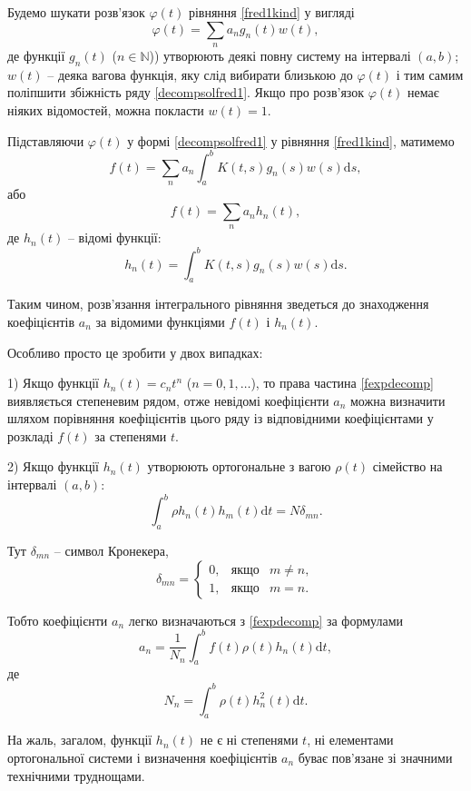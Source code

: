 \documentclass[14pt,twoside]{extreport}
\theoremstyle{mystyle}
\numberwithin{equation}{chapter}
\begin{document}
Будемо шукати розв'язок $\varphi(t)$ рівняння \eqref{fred1kind} у вигляді
\begin{equation}\label{decompsolfred1}
 \varphi(t) = \sum_{n} a_n g_n(t) w(t),
\end{equation}
де функції $g_n(t)$ ($n \in \mathbb{N}$)) утворюють деякі повну систему на інтервалі $(a, b)$; $w(t)$ -- деяка вагова функція, яку слід вибирати близькою до $\varphi(t)$ і тим самим поліпшити збіжність ряду \eqref{decompsolfred1}. Якщо про розв'язок $\varphi(t)$ немає ніяких відомостей, можна покласти $w(t) = 1$.

Підставляючи $\varphi(t)$ у формі \eqref{decompsolfred1} у рівняння \eqref{fred1kind}, матимемо
\[
 f(t) = \sum_n a_n \int_{a}^{b} K(t, s) g_n(s) w(s) \mathrm{d}s,
\]
або
\begin{equation}\label{fexpdecomp}
 f(t) = \sum_n a_n h_n(t),
\end{equation}
де $h_n(t)$ -- відомі функції:
\begin{equation}
 h_n(t) = \int_{a}^{b} K(t, s) g_n(s) w(s) \mathrm{d}s.
\end{equation}

Таким чином, розв'язання інтегрального рівняння зведеться до знаходження коефіцієнтів $a_n$ за відомими функціями $f(t)$ і $h_n(t)$.

Особливо просто це зробити у двох випадках:

1) Якщо функції $h_n(t) = c_n t^n$ ($n= 0, 1, \ldots$), то права частина \eqref{fexpdecomp} виявляється степеневим рядом, отже невідомі коефіцієнти $a_n$ можна визначити шляхом порівняння коефіцієнтів цього ряду із відповідними коефіцієнтами у розкладі $f(t)$ за степенями $t$.

2) Якщо функції $h_n(t)$ утворюють ортогональне з вагою $\rho(t)$ сімейство на інтервалі $(a, b)$:
\[
 \int_{a}^{b} \rho h_n(t) h_m(t) \mathrm{d}t = N\delta_{mn}.
\]

Тут $\delta_{mn}$ -- символ Кронекера,
\[
 \delta_{mn} = \left\{
\begin{array}{lll}
 0, &\textrm{якщо}& m \neq n,\\
 1, &\textrm{якщо}& m = n.
\end{array}
\right.
\]

Тобто коефіцієнти $a_n$ легко визначаються з \eqref{fexpdecomp} за формулами
\[
 a_n = \frac{1}{N_n} \int_{a}^{b} f(t) \rho(t) h_n(t) \mathrm{d}t,
\]
де
\[
 N_n = \int_{a}^{b} \rho(t) h_n^2(t) \mathrm{d}t.
\]

На жаль, загалом, функції $h_n(t)$ не є ні степенями $t$, ні елементами ортогональної системи і визначення коефіцієнтів $a_n$ буває пов'язане зі значними технічними труднощами.
\end{document}
